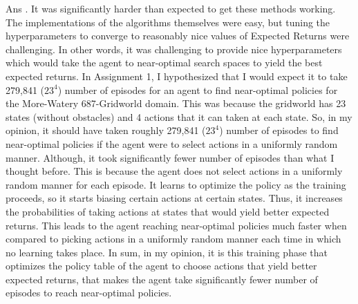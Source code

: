 \documentclass[]{article}
\begin{document}
\begin{enumerate}
	{
		\color{blue}
		Ans . It was significantly harder than expected to get these methods working. The implementations of the algorithms themselves were easy, but tuning the hyperparameters to converge to reasonably nice values of Expected Returns were challenging. In other words, it was challenging to provide nice hyperparameters which would take the agent to  near-optimal search spaces to yield the best expected returns. In Assignment 1, I hypothesized that I would expect it to take 279,841 ($23^4$) number of episodes for an agent to find near-optimal policies for the More-Watery 687-Gridworld domain. This was because the gridworld has 23 states (without obstacles) and 4 actions that it can taken at each state. So, in my opinion, it should have taken roughly 279,841 ($23^4$) number of episodes to find near-optimal policies if the agent were to select actions in a uniformly random manner. Although, it took significantly fewer number of episodes than what I thought before. This is because the agent does not select actions in a uniformly random manner for each episode. It learns to optimize the policy as the training proceeds, so it starts biasing certain actions at certain states. Thus, it increases the probabilities of taking actions at states that would yield better expected returns. This leads to the agent reaching near-optimal policies much faster when compared to picking actions in a uniformly random manner each time in which no learning takes place. In sum, in my opinion, it is this training phase that optimizes the policy table of the agent to choose actions that yield better expected returns, that makes the agent take significantly fewer number of episodes to reach near-optimal policies.

	}
\end{enumerate}


\end{document}
